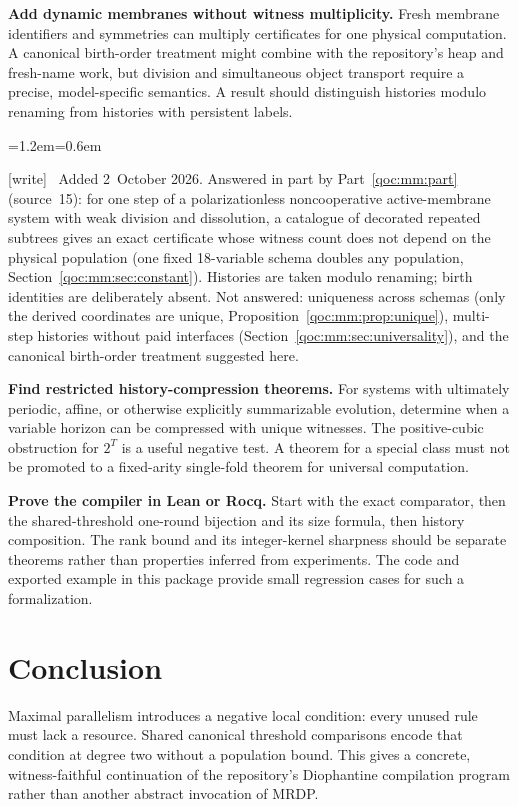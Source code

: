 \documentclass[11pt,letterpaper]{article}
\theoremstyle{definition}
\theoremstyle{remark}
\newcommand{\wtag}{\textup{[write]}}
\newenvironment{writenote}{\par\smallskip\begin{list}{}{\leftmargin=1.2em\rightmargin=0.6em}\item[]\small\wtag\ }{\end{list}\smallskip}
\begin{document}
\begin{enumerate}[label=\textbf{Q\arabic*.},leftmargin=3.0em]
\item \textbf{Add dynamic membranes without witness multiplicity.}
Fresh membrane identifiers and symmetries can multiply certificates for
one physical computation. A canonical birth-order treatment might combine
with the repository's heap and fresh-name work, but division and
simultaneous object transport require a precise, model-specific semantics.
A result should distinguish histories modulo renaming from histories
with persistent labels.
\begin{writenote}
Added 2~October 2026. Answered in part by Part~\ref{qoc:mm:part} (source~15): for one step of a polarizationless noncooperative active-membrane system with weak division and dissolution, a catalogue of decorated repeated subtrees gives an exact certificate whose witness count does not depend on the physical population (one fixed 18-variable schema doubles any population, Section~\ref{qoc:mm:sec:constant}). Histories are taken modulo renaming; birth identities are deliberately absent. Not answered: uniqueness across schemas (only the derived coordinates are unique, Proposition~\ref{qoc:mm:prop:unique}), multi-step histories without paid interfaces (Section~\ref{qoc:mm:sec:universality}), and the canonical birth-order treatment suggested here.
\end{writenote}

\item \textbf{Find restricted history-compression theorems.}
For systems with ultimately periodic, affine, or otherwise explicitly
summarizable evolution, determine when a variable horizon can be compressed
with unique witnesses. The positive-cubic obstruction for $2^T$ is a useful
negative test. A theorem for a special class must not be promoted to a
fixed-arity single-fold theorem for universal computation.

\item \textbf{Prove the compiler in Lean or Rocq.}
Start with the exact comparator, then the shared-threshold one-round
bijection and its size formula, then history composition. The rank bound
and its integer-kernel sharpness should be separate theorems rather than
properties inferred from experiments. The code and exported example in
this package provide small regression cases for such a formalization.
\end{enumerate}

\section{Conclusion}
Maximal parallelism introduces a negative local condition: every unused
rule must lack a resource. Shared canonical threshold comparisons encode
that condition at degree two without a population bound. This gives a
concrete, witness-faithful continuation of the repository's Diophantine
compilation program rather than another abstract invocation of MRDP.
\end{document}

